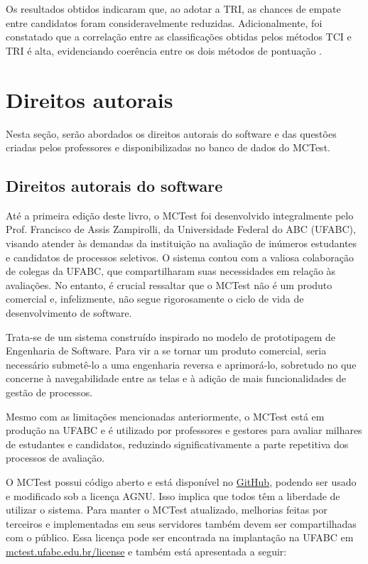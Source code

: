 Os resultados obtidos indicaram que, ao adotar a TRI, as chances de empate entre candidatos foram consideravelmente reduzidas. Adicionalmente, foi constatado que a correlação entre as classificações obtidas pelos métodos TCI e TRI é alta, evidenciando coerência entre os dois métodos de pontuação \cite{2021:Zampirolli.Batista.ea}.


\section{Direitos autorais}

Nesta seção, serão abordados os direitos autorais do software e das questões criadas pelos professores e disponibilizadas no banco de dados do MCTest.

\subsection{Direitos autorais do software}

Até a primeira edição deste livro, o MCTest foi desenvolvido integralmente pelo Prof. Francisco de Assis Zampirolli, da Universidade Federal do ABC (UFABC), visando atender às demandas da instituição na avaliação de inúmeros estudantes e candidatos de processos seletivos. O sistema contou com a valiosa colaboração de colegas da UFABC, que compartilharam suas necessidades em relação às avaliações. No entanto, é crucial ressaltar que o MCTest não é um produto comercial e, infelizmente, não segue rigorosamente o ciclo de vida de desenvolvimento de software.

Trata-se de um sistema construído inspirado no modelo de prototipagem de Engenharia de Software. Para vir a se tornar um produto comercial, seria necessário submetê-lo a uma engenharia reversa e aprimorá-lo, sobretudo no que concerne à navegabilidade entre as telas e à adição de mais funcionalidades de gestão de processos. 

Mesmo com as limitações mencionadas anteriormente, o MCTest está em produção na UFABC e é utilizado por professores e gestores para avaliar milhares de estudantes e candidatos, reduzindo significativamente a parte repetitiva dos processos de avaliação.

O MCTest possui código aberto e está disponível no \href{https://github.com/fzampirolli/mctest}{GitHub}, podendo ser usado e modificado sob a licença AGNU. Isso implica que todos têm a liberdade de utilizar o sistema. Para manter o MCTest atualizado, melhorias feitas por terceiros e implementadas em seus servidores também devem ser compartilhadas com o público. Essa licença pode ser encontrada na implantação na UFABC em \href{http://mctest.ufabc.edu.br/license}{mctest.ufabc.edu.br/license} e também está apresentada a seguir:

